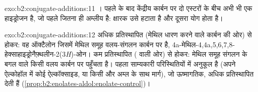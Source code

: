 \begin{solution}{exo:b2:conjugate-additions:11}
। पहले  के बाद केंद्रीय कार्बन पर दो एस्टरों के बीच अभी भी एक
हाइड्रोजन है, जो पहले जितना ही अम्लीय है: क्षारक उसे हटाता है और दूसरा योग होता है।
\end{solution}

\begin{solution}{exo:b2:conjugate-additions:12}
अधिक प्रतिस्थापित  (मेथिल धारण करने वाले कार्बन की ओर) से होकर: वह ऑक्टैलोन जिसमें मेथिल
समूह वलय-संगलन कार्बन पर है, 4a-मेथिल-4,4a,5,6,7,8-हेक्साहाइड्रोनैफ़्थलीन-2(3\textit{H})-ओन। कम
प्रतिस्थापित  ( वाली ओर) से होकर: मेथिल समूह संगलन के बगल वाले किसी वलय कार्बन पर पहुँचता है।
पहला साम्यकारी परिस्थितियों में अनुकूल है (अपने ऐल्कोहॉल में कोई ऐल्कॉक्साइड, या किसी  और अम्ल के साथ
 मार्ग), जो ऊष्मागतिक, अधिक प्रतिस्थापित  देती हैं
(\cref{prop:b2:enolates-aldol:enolate-control})।
\end{solution}

